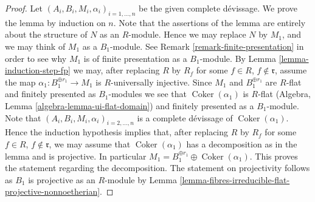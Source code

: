 \documentclass[10pt,a4paper]{amsart}
\theoremstyle{plain}
\theoremstyle{definition}
\theoremstyle{remark}
\numberwithin{equation}{subsection}
\def\Coker{\mathop{\mathrm{Coker}}}
\begin{document}
\begin{proof}
Let $(A_i, B_i, M_i, \alpha_i)_{i = 1, \ldots, n}$ be the given
complete d\'evissage. We prove the lemma by induction on $n$.
Note that the assertions of the lemma are entirely about the structure
of $N$ as an $R$-module. Hence we may replace $N$ by $M_1$, and we
may think of $M_1$ as a $B_1$-module. See
Remark \ref{remark-finite-presentation}
in order to see why $M_1$ is of finite presentation as a $B_1$-module. By
Lemma \ref{lemma-induction-step-fp}
we may, after replacing $R$ by $R_f$ for some
$f \in R$, $f \not \in \mathfrak r$, assume
the map $\alpha_1 : B_1^{\oplus r_1} \to M_1$ is $R$-universally injective.
Since $M_1$ and $B_1^{\oplus r_1}$ are $R$-flat and finitely presented as
$B_1$-modules we see that $\Coker(\alpha_1)$ is $R$-flat
(Algebra, Lemma \ref{algebra-lemma-ui-flat-domain})
and finitely presented as a $B_1$-module. Note that
$(A_i, B_i, M_i, \alpha_i)_{i = 2, \ldots, n}$ is a complete
d\'evissage of $\Coker(\alpha_1)$. Hence the induction hypothesis
implies that, after replacing
$R$ by $R_f$ for some $f \in R$, $f \not \in \mathfrak r$,
we may assume that $\Coker(\alpha_1)$ has a decomposition
as in the lemma and is projective. In particular
$M_1 = B_1^{\oplus r_1} \oplus \Coker(\alpha_1)$.
This proves the statement regarding the decomposition.
The statement on projectivity follows as $B_1$ is projective as
an $R$-module by
Lemma \ref{lemma-fibres-irreducible-flat-projective-nonnoetherian}.
\end{proof}
\end{document}
